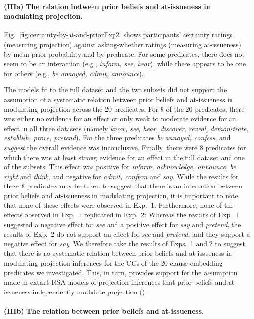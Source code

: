 \documentclass[11pt,fleqn]{article}
\newcommand{\6}{\mbox{$[\hspace*{-.6mm}[$}}
\newcommand{\9}{\mbox{$]\hspace*{-.6mm}]$}}
\begin{document}
\paragraph{(IIIa) The relation between prior beliefs and at-issueness in modulating projection.} Fig.~\ref{fig:certainty-by-ai-and-priorExp2} shows participants' certainty ratings (measuring projection) against asking-whether ratings (measuring at-issueness) by mean prior probability and by predicate. For some predicates, there does not seem to be an interaction (e.g., {\em inform, see, hear}), while there appears to be one for others  (e.g., {\em be annoyed, admit, announce}). 

The models fit to the full dataset and the two subsets did not support the assumption of a systematic relation between prior beliefs and at-issueness in modulating projection across the 20 predicates. For 9 of the 20 predicates, there was either no evidence for an effect or only weak to moderate evidence for an effect in all three datasets (namely {\em know, see, hear, discover, reveal, demonstrate, establish, prove, pretend}). For the three predicates {\em be annoyed, confess}, and {\em suggest} the overall evidence was inconclusive.  Finally, there were 8 predicates for which there was at least strong evidence for an effect in the full dataset and one of the subsets: This effect was positive for {\em inform, acknowledge, announce, be right} and {\em think}, and negative for {\em admit, confirm} and {\em say}. While the results for these 8 predicates may be taken to suggest that there is an interaction between prior beliefs and at-issueness in modulating projection, it is important to note that none of these effects were observed in Exp.~1. Furthermore, none of the effects observed in Exp.~1 replicated in Exp.~2: Whereas the results of Exp.~1 suggested a negative effect for {\em see} and a positive effect for {\em say} and {\em pretend}, the results of Exp.~2 do not support an effect for {\em see} and {\em pretend}, and they support a negative effect for {\em say}. We therefore take the results of Exps.~1 and 2 to suggest that there is no systematic relation between prior beliefs and at-issueness in modulating projection inferences for the CCs of the 20 clause-embedding predicates we investigated. This, in turn, provides support for the assumption made in extant RSA models of projection inferences that prior beliefs and at-issueness independently modulate projection (\citealt{qing-etal2016,stevens-etal2017,warstadt2022,pan-degen2023}). 

\paragraph{(IIIb) The relation between prior beliefs and at-issueness.} 
\end{document}

